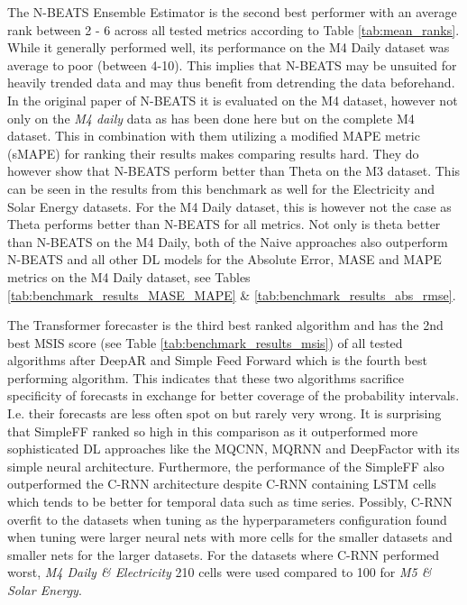 The N-BEATS Ensemble Estimator is the second best performer with an average rank between 2 - 6 across all tested metrics according to Table \ref{tab:mean_ranks}. While it generally performed well, its performance on the M4 Daily dataset was average to poor (between 4-10). This implies that N-BEATS may be unsuited for heavily trended data and may thus benefit from detrending the data beforehand. In the original paper of N-BEATS it is evaluated on the M4 dataset, however not only on the \textit{M4 daily} data as has been done here but on the complete M4 dataset. This in combination with them utilizing a modified MAPE metric (sMAPE) for ranking their results makes comparing results hard. They do however show that N-BEATS perform better than Theta on the M3 dataset. This can be seen in the results from this benchmark as well for the Electricity and Solar Energy datasets. For the M4 Daily dataset, this is however not the case as Theta performs better than N-BEATS for all metrics. Not only is theta better than N-BEATS on the M4 Daily, both of the Naive approaches also outperform N-BEATS and all other DL models for the Absolute Error, MASE and MAPE metrics on the M4 Daily dataset, see Tables \ref{tab:benchmark_results_MASE_MAPE} \& \ref{tab:benchmark_results_abs_rmse}.

The Transformer forecaster is the third best ranked algorithm and has the 2nd best MSIS score (see Table \ref{tab:benchmark_results_msis}) of all tested algorithms after DeepAR and Simple Feed Forward which is the fourth best performing algorithm. This indicates that these two algorithms sacrifice specificity of forecasts in exchange for better coverage of the probability intervals. I.e. their forecasts are less often spot on but rarely very wrong. It is surprising that SimpleFF ranked so high in this comparison as it outperformed more sophisticated DL approaches like the MQCNN, MQRNN and DeepFactor with its simple neural architecture. Furthermore, the performance of the SimpleFF also outperformed the C-RNN architecture despite C-RNN containing LSTM cells which tends to be better for temporal data such as time series. Possibly, C-RNN overfit to the datasets when tuning as the hyperparameters configuration found when tuning were larger neural nets with more cells for the smaller datasets and smaller nets for the larger datasets. For the datasets where C-RNN performed worst, \textit{M4 Daily \& Electricity} 210 cells were used compared to 100 for \textit{M5 \& Solar Energy}.

